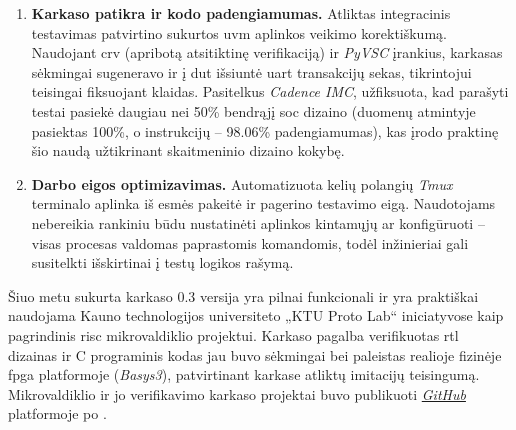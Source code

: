 \begin{enumerate}
	\item \textbf{Karkaso patikra ir kodo padengiamumas.} Atliktas integracinis testavimas patvirtino sukurtos \gls{uvm} aplinkos veikimo korektiškumą. Naudojant \gls{crv} (apribotą atsitiktinę verifikaciją) ir \textit{PyVSC} įrankius, karkasas sėkmingai sugeneravo ir į \gls{dut} išsiuntė \gls{uart} transakcijų sekas, tikrintojui  teisingai fiksuojant klaidas. Pasitelkus \textit{Cadence IMC}, užfiksuota, kad parašyti testai pasiekė daugiau nei 50\% bendrąjį \gls{soc} dizaino  (duomenų atmintyje pasiektas 100\%, o instrukcijų -- 98.06\% padengiamumas), kas įrodo praktinę šio  naudą užtikrinant skaitmeninio dizaino kokybę.
	
	\item \textbf{Darbo eigos optimizavimas.} Automatizuota kelių polangių \textit{Tmux} terminalo aplinka iš esmės pakeitė ir pagerino testavimo eigą. Naudotojams nebereikia rankiniu būdu nustatinėti aplinkos kintamųjų ar konfigūruoti  -- visas procesas valdomas paprastomis komandomis, todėl inžinieriai gali susitelkti išskirtinai į testų logikos rašymą.
\end{enumerate}

Šiuo metu sukurta  karkaso 0.3 versija yra pilnai funkcionali ir yra praktiškai naudojama Kauno technologijos universiteto „KTU Proto Lab“ iniciatyvose kaip pagrindinis  \gls{risc} mikrovaldiklio projektui. Karkaso pagalba verifikuotas \gls{rtl} dizainas ir C programinis kodas jau buvo sėkmingai  bei paleistas realioje fizinėje \gls{fpga} platformoje (\textit{Basys3}), patvirtinant karkase atliktų imitacijų teisingumą. Mikrovaldiklio ir jo verifikavimo karkaso projektai buvo publikuoti \href{https://github.com/ktu-proto-lab/mlab_mcu_pyuvm}{\textit{GitHub}} platformoje po .
